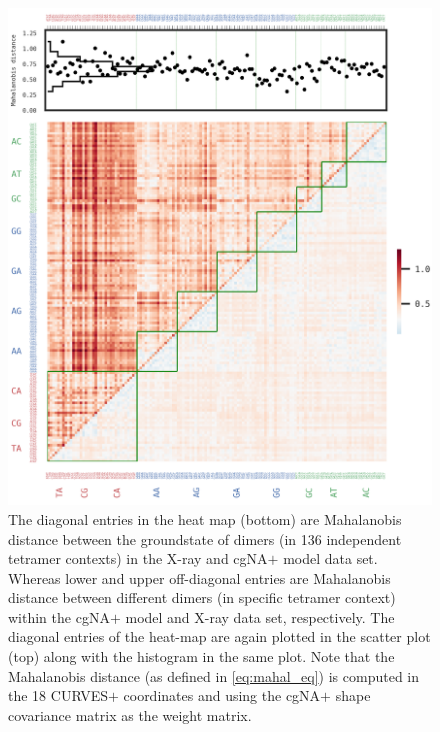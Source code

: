 \begin{figure}[H]
	\begin{center}
	\includegraphics[scale=1.45]{./Xray_images/X3_heat_mahal_pca_18_comb.png}
	\caption{
	The diagonal entries in the heat map (bottom) are Mahalanobis distance between the groundstate of dimers (in 136 independent tetramer contexts) in the X-ray and cgNA$+$ model data set. Whereas lower and upper off-diagonal entries are Mahalanobis distance between different dimers (in specific tetramer context) within the cgNA$+$ model and X-ray data set, respectively. The diagonal entries of the heat-map are again plotted in the scatter plot (top) along with the histogram in the same plot.
	Note that the Mahalanobis distance (as defined in \cref{eq:mahal_eq}) is computed in the 18 CURVES$+$ coordinates and using the cgNA$+$ shape covariance matrix as the weight matrix. 
    }
\label{SIfig:Mahal_18}
\end{center}
\end{figure}





